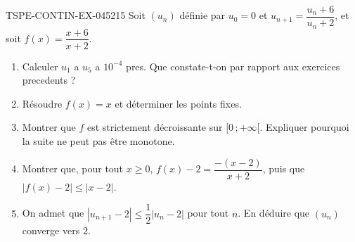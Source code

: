 \begin{exercice}{TSPE-CONTIN-EX-045}{2}{15}
Soit $(u_n)$ définie par $u_0 = 0$ et $u_{n+1} = \dfrac{u_n + 6}{u_n + 2}$, et soit $f(x) = \dfrac{x+6}{x+2}$.
\begin{enumerate}
  \item Calculer $u_1$ a $u_5$ a $10^{-4}$ pres. Que constate-t-on par rapport aux exercices precedents ?
  \item Résoudre $f(x) = x$ et déterminer les points fixes.
  \item Montrer que $f$ est strictement décroissante sur $[0\,;+\infty[$. Expliquer pourquoi la suite ne peut pas être monotone.
  \item Montrer que, pour tout $x \geq 0$, $f(x) - 2 = \dfrac{-(x-2)}{x+2}$, puis que $\left|f(x) - 2\right| \leq \left|x - 2\right|$.
  \item On admet que $\left|u_{n+1} - 2\right| \leq \dfrac{1}{2}\left|u_n - 2\right|$ pour tout $n$. En déduire que $(u_n)$ converge vers $2$.
\end{enumerate}
\end{exercice}
